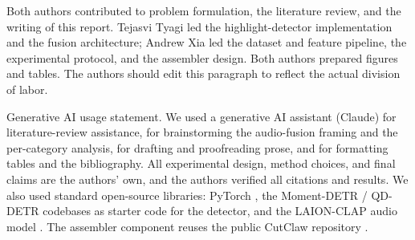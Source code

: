 \documentclass[10pt,twocolumn,letterpaper]{article}
\begin{document}
Both authors contributed to problem formulation, the literature review, and the writing of this report. Tejasvi Tyagi led the highlight-detector implementation and the fusion architecture; Andrew Xia led the dataset and feature pipeline, the experimental protocol, and the assembler design. Both authors prepared figures and tables. The authors should edit this paragraph to reflect the actual division of labor.

Generative AI usage statement. We used a generative AI assistant (Claude) for literature-review assistance, for brainstorming the audio-fusion framing and the per-category analysis, for drafting and proofreading prose, and for formatting tables and the bibliography. All experimental design, method choices, and final claims are the authors' own, and the authors verified all citations and results. We also used standard open-source libraries: PyTorch \cite{pytorch}, the Moment-DETR / QD-DETR codebases \cite{momentdetr,qddetr} as starter code for the detector, and the LAION-CLAP audio model \cite{laionclap}. The assembler component reuses the public CutClaw repository \cite{cutclaw}.
\end{document}

